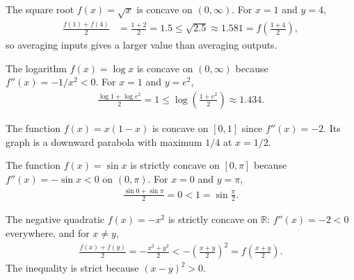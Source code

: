 \documentclass[a4paper, 12pt]{book}
\begin{document}
\begin{example}
    The square root $f(x)=\sqrt{x}$ is concave on $(0,\infty)$. For $x=1$ and $y=4$,
    \begin{align}
        \frac{f(1)+f(4)}{2} &= \frac{1+2}{2}=1.5
        \leq \sqrt{2.5}\approx1.581 = f\!\left(\frac{1+4}{2}\right),
    \end{align}
    so averaging inputs gives a larger value than averaging outputs.
\end{example}

\begin{example}
    The logarithm $f(x)=\log x$ is concave on $(0,\infty)$ because $f''(x)=-1/x^2<0$. For $x=1$ and $y=e^2$,
    \begin{align}
        \frac{\log 1+\log e^2}{2}=1 \leq \log\left(\frac{1+e^2}{2}\right)\approx1.434.
    \end{align}
\end{example}

\begin{example}
    The function $f(x)=x(1-x)$ is concave on $[0,1]$ since $f''(x)=-2$. Its graph is a downward parabola with maximum $1/4$ at $x=1/2$.
\end{example}

\begin{example}
    The function $f(x)=\sin x$ is strictly concave on $[0,\pi]$ because $f''(x)=-\sin x<0$ on $(0,\pi)$. For $x=0$ and $y=\pi$,
    \begin{align}
        \frac{\sin 0+\sin\pi}{2}=0 < 1=\sin\frac{\pi}{2}.
    \end{align}
\end{example}

\begin{example}
    The negative quadratic $f(x)=-x^2$ is strictly concave on $\mathbb{R}$: $f''(x)=-2<0$ everywhere, and for $x\neq y$,
    \begin{align}
        \frac{f(x)+f(y)}{2} = -\frac{x^2+y^2}{2}
        < -\left(\frac{x+y}{2}\right)^2 = f\!\left(\frac{x+y}{2}\right).
    \end{align}
    The inequality is strict because $(x-y)^2>0$.
\end{example}
\end{document}
